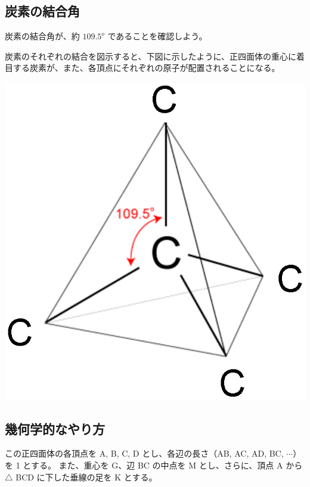 \documentclass[uplatex,dvipdfmx,a4paper,11pt, titlepage]{jsarticle}
\begin{document}
\begin{itemize}
%
%
%

\end{itemize}

\newpage

\begin{appendix}

\section{炭素の結合角}
\label{sec: carbon_BA}

炭素の結合角が、約 $109.5^o$ であることを確認しよう。

炭素のそれぞれの結合を図示すると、下図に示したように、正四面体の重心に着目する炭素が、また、各頂点にそれぞれの原子が配置されることになる。

\begin{center}
	\includegraphics[width= 5 cm]{figure/carbon.eps}
\end{center}

\subsection{幾何学的なやり方}

この正四面体の各頂点を A, B, C, D とし、各辺の長さ（AB, AC, AD, BC, $\cdots$）を 1 とする。
また、重心を G、辺 BC の中点を M とし、さらに、頂点 A から $\bigtriangleup$ BCD に下した垂線の足を K とする。



\end{appendix}
\end{document}
